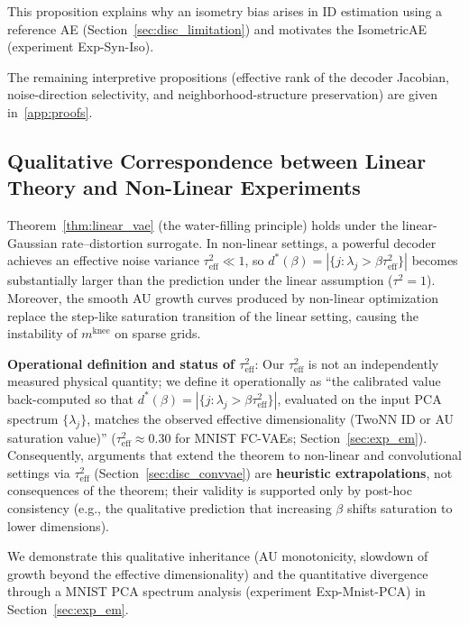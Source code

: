 \documentclass[make,article,submit,pdftex,moreauthors]{Definitions/mdpi}
\newcommand{\mknee}{m^{\mathrm{knee}}}
\begin{document}
This proposition explains why an isometry bias arises in ID estimation using a reference
AE (Section~\ref{sec:disc_limitation}) and motivates the IsometricAE
(experiment Exp-Syn-Iso).

The remaining interpretive propositions (effective rank of the decoder Jacobian,
noise-direction selectivity, and neighborhood-structure preservation) are given
in~\ref{app:proofs}.

\subsection{Qualitative Correspondence between Linear Theory and Non-Linear Experiments}\label{sec:theory_bridge}

Theorem~\ref{thm:linear_vae} (the water-filling principle) holds under the
linear-Gaussian rate--distortion surrogate.
In non-linear settings, a powerful decoder achieves an effective noise variance
$\tau^2_\mathrm{eff} \ll 1$, so
$d^*(\beta) = |\{j : \lambda_j > \beta\tau^2_\mathrm{eff}\}|$ becomes substantially
larger than the prediction under the linear assumption ($\tau^2=1$).
Moreover, the smooth AU growth curves produced by non-linear optimization replace the
step-like saturation transition of the linear setting, causing the instability of
$\mknee$ on sparse grids.

\textbf{Operational definition and status of $\tau^2_\mathrm{eff}$}:
Our $\tau^2_\mathrm{eff}$ is not an independently measured physical quantity;
we define it operationally as ``the calibrated value back-computed so that
$d^*(\beta) = |\{j : \lambda_j > \beta\tau^2_\mathrm{eff}\}|$, evaluated on the
input PCA spectrum $\{\lambda_j\}$, matches the observed effective
dimensionality (TwoNN ID or AU saturation value)''
($\tau^2_\mathrm{eff} \approx 0.30$ for MNIST FC-VAEs; Section~\ref{sec:exp_em}).
Consequently, arguments that extend the theorem to non-linear and convolutional
settings via $\tau^2_\mathrm{eff}$ (Section~\ref{sec:disc_convvae}) are
\textbf{heuristic extrapolations}, not consequences of the theorem; their
validity is supported only by post-hoc consistency (e.g., the qualitative
prediction that increasing $\beta$ shifts saturation to lower dimensions).

We demonstrate this qualitative inheritance (AU monotonicity, slowdown of growth beyond
the effective dimensionality) and the quantitative divergence through a MNIST PCA
spectrum analysis (experiment Exp-Mnist-PCA) in Section~\ref{sec:exp_em}.
\end{document}
